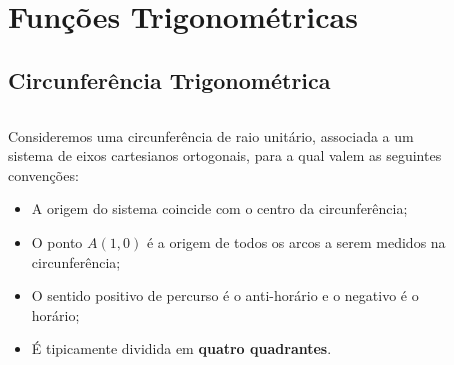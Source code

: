 \section{Funções Trigonométricas}

\subsection{Circunferência Trigonométrica}
\begin{frame}
  \begin{columns}[onlytextwidth]
    \begin{column}{0.52\textwidth}
      \begin{definition}
        Consideremos uma circunferência de raio unitário, associada a um sistema de eixos cartesianos ortogonais, para a qual valem as seguintes convenções:
        \begin{itemize}
          \item A origem do sistema coincide com o centro da circunferência;
          \item O ponto $A(1,0)$ é a origem de todos os arcos a serem medidos na circunferência;
          \item O sentido positivo de percurso é o anti-horário e o negativo é o horário;
          \item É tipicamente dividida em \textbf{quatro quadrantes}.
        \end{itemize}
      \end{definition}
    \end{column}
    \begin{column}{0.47\textwidth}
      \begin{figure}
      \end{figure}
    \end{column}
  \end{columns}
\end{frame}

